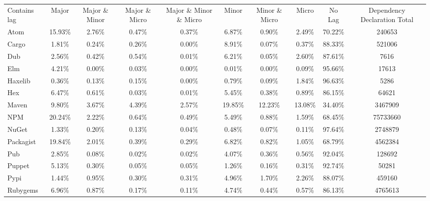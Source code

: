 \begin{tabular}{|l|ccccccc|c|c|}
\hline
\multirow{3}{*}{Contains lag} & \multirow{3}{*}{Major} & \multirow{3}{*}{Major \& Minor} & \multirow{3}{*}{Major \& Micro} & \multirow{3}{*}{Major \& Minor \& Micro} & \multirow{3}{*}{Minor} & \multirow{3}{*}{Minor \& Micro} & \multirow{3}{*}{Micro} & \multirow{3}{*}{No Lag} & \multirow{3}{*}{Dependency Declaration Total} \\
 & & & & & & & & & \\
 & & & & & & & & & \\
\hline
Atom & 15.93\% & 2.76\% & 0.47\% & 0.37\% & 6.87\% & 0.90\% & 2.49\% & 70.22\% & 240653 \\
Cargo & 1.81\% & 0.24\% & 0.26\% & 0.00\% & 8.91\% & 0.07\% & 0.37\% & 88.33\% & 521006 \\
Dub & 2.56\% & 0.42\% & 0.54\% & 0.01\% & 6.21\% & 0.05\% & 2.60\% & 87.61\% & 7616 \\
Elm & 4.21\% & 0.00\% & 0.03\% & 0.00\% & 0.01\% & 0.00\% & 0.09\% & 95.66\% & 17613 \\
Haxelib & 0.36\% & 0.13\% & 0.15\% & 0.00\% & 0.79\% & 0.09\% & 1.84\% & 96.63\% & 5286 \\
Hex & 6.47\% & 0.61\% & 0.03\% & 0.01\% & 5.45\% & 0.38\% & 0.89\% & 86.15\% & 64621 \\
Maven & 9.80\% & 3.67\% & 4.39\% & 2.57\% & 19.85\% & 12.23\% & 13.08\% & 34.40\% & 3467909 \\
NPM & 20.24\% & 2.22\% & 0.64\% & 0.49\% & 5.49\% & 0.88\% & 1.59\% & 68.45\% & 75733660 \\
NuGet & 1.33\% & 0.20\% & 0.13\% & 0.04\% & 0.48\% & 0.07\% & 0.11\% & 97.64\% & 2748879 \\
Packagist & 19.84\% & 2.01\% & 0.39\% & 0.29\% & 6.82\% & 0.82\% & 1.05\% & 68.79\% & 4562384 \\
Pub & 2.85\% & 0.08\% & 0.02\% & 0.02\% & 4.07\% & 0.36\% & 0.56\% & 92.04\% & 128692 \\
Puppet & 5.13\% & 0.30\% & 0.05\% & 0.05\% & 1.26\% & 0.16\% & 0.31\% & 92.74\% & 50281 \\
Pypi & 1.44\% & 0.95\% & 0.30\% & 0.31\% & 4.96\% & 1.70\% & 2.26\% & 88.07\% & 459160 \\
Rubygems & 6.96\% & 0.87\% & 0.17\% & 0.11\% & 4.74\% & 0.44\% & 0.57\% & 86.13\% & 4765613 \\
\hline
\end{tabular}
